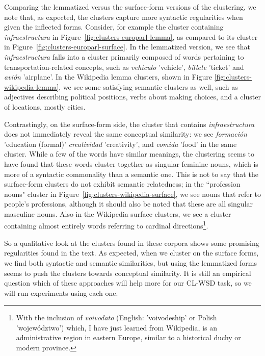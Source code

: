 Comparing the lemmatized versus the surface-form versions of the clustering, we
note that, as expected, the clusters capture more syntactic regularities when
given the inflected forms. Consider, for example the cluster containing
\emph{infraestructura} in Figure~\ref{fig:clusters-europarl-lemma}, as compared
to its cluster in Figure~\ref{fig:clusters-europarl-surface}. In the lemmatized
version, we see that \emph{infraestructura} falls into a cluster primarily
composed of words pertaining to transportation-related concepts, such as
\emph{vehículo} 'vehicle', \emph{billete} 'ticket' and \emph{avión} 'airplane'.
In the Wikipedia lemma clusters, shown in Figure
\ref{fig:clusters-wikipedia-lemma}, we see some satisfying semantic clusters as
well, such as adjectives describing political positions, verbs about making
choices, and a cluster of locations, mostly cities.

Contrastingly, on the surface-form side, the cluster that contains
\emph{infraestructura} does not immediately reveal the same conceptual
similarity: we see \emph{formación} 'education (formal)' \emph{creatividad}
'creativity', and \emph{comida} 'food' in the same cluster. While a few of the
words have similar meanings, the clustering seems to have found that these
words cluster together as singular feminine nouns, which is more of a
syntactic commonality than a semantic one. This is not to say that the
surface-form clusters do not exhibit semantic relatedness; in the ``profession
nouns" cluster in Figure~\ref{fig:clusters-wikipedia-surface}, we see nouns
that refer to people's professions, although it should also be noted that these
are all singular masculine nouns. Also in the Wikipedia surface clusters, we
see a cluster containing almost entirely words referring to cardinal
directions\footnote{With the inclusion of \emph{voivodato} (English:
'voivodeship' or Polish 'województwo') which, I have just learned from
Wikipedia, is an administrative region in eastern Europe, similar to a
historical duchy or modern province.}.

So a qualitative look at the clusters found in these corpora shows some
promising regularities found in the text. As expected, when we cluster on the
surface forms, we find both syntactic and semantic similarities, but using the
lemmatized forms seems to push the clusters towards conceptual similarity. It
is still an empirical question which of these approaches will help more for our
CL-WSD task, so we will run experiments using each one.

